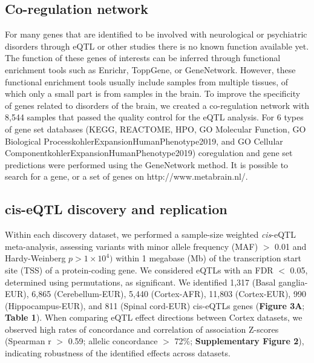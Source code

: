 {{\subsection{Co-regulation network }
For many genes that are identified to be involved with neurological or psychiatric disorders through eQTL or other studies there is no known function available yet. The function of these genes of interests can be inferred through functional enrichment tools such as Enrichr\cite{chenEnrichrInteractiveCollaborative2013,EnrichrComprehensiveGene}, ToppGene\cite{chenToppGeneSuiteGene2009}, or GeneNetwork\cite{deelenImprovingDiagnosticYield2019}. However, these functional enrichment tools usually include samples from multiple tissues, of which only a small part is from samples in the brain. To improve the specificity of genes related to disorders of the brain, we created a co-regulation network with 8,544 samples that passed the quality control for the eQTL analysis. For 6 types of gene set databases (KEGG\cite{kanehisaKEGGKyotoEncyclopedia2000}, REACTOME\cite{jassalReactomePathwayKnowledgebase2020}, HPO\cite{kohlerExpansionHumanPhenotype2019}, GO Molecular Function\cite{kohlerExpansionHumanPhenotype2019}, GO Biological ProcesskohlerExpansionHumanPhenotype2019, and GO Cellular ComponentkohlerExpansionHumanPhenotype2019) coregulation and gene set predictions were performed using the GeneNetwork method\cite{deelenImprovingDiagnosticYield2019}. It is possible to search for a gene, or a set of genes on http://www.metabrain.nl/. 

\subsection{cis-eQTL discovery and replication }
Within each discovery dataset, we performed a sample-size weighted \emph{cis}-eQTL meta-analysis, assessing variants with minor allele frequency (MAF) $>$ 0.01 and Hardy-Weinberg $p > 1 \times 10^{4})$ within 1 megabase (Mb) of the transcription start site (TSS) of a protein-coding gene. We considered eQTLs with an FDR $<$ 0.05, determined using permutations, as significant. We identified 1,317 (Basal ganglia-EUR), 6,865 (Cerebellum-EUR), 5,440 (Cortex-AFR), 11,803 (Cortex-EUR), 990 (Hippocampus-EUR), and 811 (Spinal cord-EUR) cis-eQTLs genes (\textbf{Figure 3A}; \textbf{Table 1}). When comparing eQTL effect directions between Cortex datasets, we observed high rates of concordance and correlation of association Z-scores (Spearman r $>$ 0.59; allelic concordance $>$ 72\%; \textbf{Supplementary Figure 2}), indicating robustness of the identified effects across datasets.  

}}
